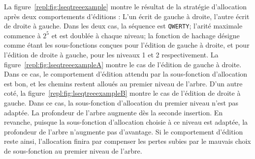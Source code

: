 La figure~\ref{repl:fig:lseqtreeexample} montre le résultat de la stratégie
d'allocation \LSEQ après deux comportements d'éditions : L'un écrit de gauche à
droite, l'autre écrit de droite à gauche. Dans les deux cas, la séquence est
\texttt{QWERTY}; l'arité maximale commence à $2^5$ et est doublée à chaque
niveau; la fonction de hachage désigne comme étant les sous-fonctions conçues
pour l'édition de gauche à droite, et pour l'édition de droite à gauche, pour
les niveaux 1 et 2 respectivement. La figure~\ref{repl:fig:lseqtreeexampleA}
montre le cas de l'édition de gauche à droite. Dans ce cas, le comportement
d'édition attendu par la sous-fonction d'allocation est bon, et les chemins
restent alloués au premier niveau de l'arbre. D'un autre coté, la
figure~\ref{repl:fig:lseqtreeexampleB} montre le cas de l'édition de droite à
gauche. Dans ce cas, la sous-fonction d'allocation du premier niveau n'est pas
adaptée. La profondeur de l'arbre augmente dès la seconde insertion. En
revanche, puisque la sous-fonction d'allocation choisie à ce niveau est adaptée,
la profondeur de l'arbre n'augmente pas d'avantage. Si le comportement d'édition
reste ainsi, l'allocation finira par compenser les pertes subies par le mauvais
choix de sous-fonction au premier niveau de l'arbre. 



